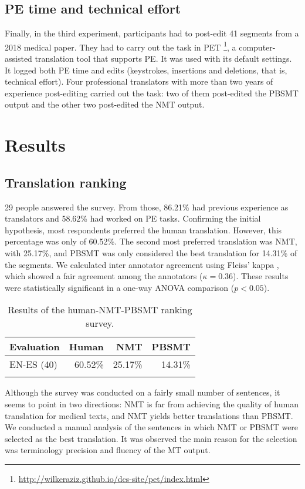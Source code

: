 \documentclass[output=paper]{langsci/langscibook}
\begin{document}
\subsection{PE time and technical effort}
Finally, in the third experiment, participants had to post-edit 41 segments from a 2018 medical paper. They had to carry out the task in PET \citep{Aziz}\footnote{\url{http://wilkeraziz.github.io/dcs-site/pet/index.html}}, a computer-assisted translation tool that supports PE. It was used with its default settings. It logged both PE time and edits (keystrokes, insertions and deletions, that is, technical effort). Four professional translators with more than two years of experience post-editing carried out the task: two of them post-edited the PBSMT output and the other two post-edited the NMT output. 


\section{Results} \label{Results}
\subsection{Translation ranking}
29 people answered the survey. From those, 86.21\% had previous experience as translators and 58.62\% had worked on PE tasks. Confirming the initial hypothesis, most respondents preferred the human translation. However, this percentage was only of 60.52\%. The second most preferred translation was NMT, with 25.17\%, and PBSMT was only considered the best translation for 14.31\% of the segments. We calculated inter annotator agreement using Fleiss' kappa \citep{fleiss1971}, which showed a fair agreement among the annotators ($\kappa=0.36$). These results were statistically significant in a one-way ANOVA comparison ($p<0.05$).

\begin{table}
\begin{tabularx}{.66\textwidth}{Xrrr}
\lsptoprule
{Evaluation} & {Human} & {NMT} & {PBSMT}\\
\midrule
EN-ES (40) & 60.52\% & 25.17\% & 14.31\% \\
\lspbottomrule
\end{tabularx}
\caption{\label{human-NMT-PBSMT}Results of the human-NMT-PBSMT ranking survey.}
\end{table}

Although the survey was conducted on a fairly small number of sentences, it seems to point in two directions: NMT is far from achieving the quality of human translation for medical texts, and NMT yields better translations than PBSMT. We conducted a manual analysis of the sentences in which NMT or PBSMT were selected as the best translation. It was observed the main reason for the selection was terminology precision and fluency of the MT output.
\end{document}
